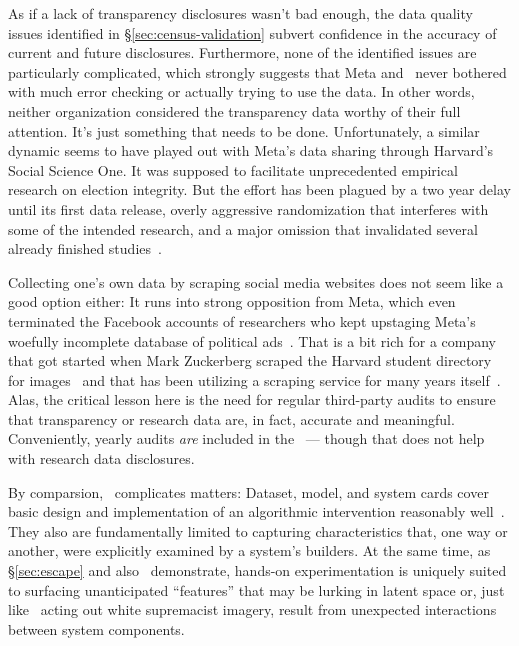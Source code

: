 As if a lack of transparency disclosures wasn't bad enough, the data quality
issues identified in \S\ref{sec:census-validation} subvert confidence in the
accuracy of current and future disclosures. Furthermore, none of the identified
issues are particularly complicated, which strongly suggests that Meta and
\NCMEC\ never bothered with much error checking or actually trying to use the
data. In other words, neither organization considered the transparency data
worthy of their full attention. It's just something that needs to be done.
Unfortunately, a similar dynamic seems to have played out with Meta's data
sharing through Harvard's Social Science One. It was supposed to facilitate
unprecedented empirical research on election integrity. But the effort has been
plagued by a two year delay until its first data release, overly aggressive
randomization that interferes with some of the intended research, and a major
omission that invalidated several already finished
studies~\cite{Hegelich2020,HegelichMarcoea2020,Ingram2022,OHaraNelson2019,Timberg2021}.

Collecting one's own data by scraping social media websites does not seem like a
good option either: It runs into strong opposition from Meta, which even
terminated the Facebook accounts of researchers who kept upstaging Meta's
woefully incomplete database of political
ads~\cite{EdelsonMcCoy2021a,Faife2021a,MerrillTobin2019,Roose2021a}. That is a
bit rich for a company that got started when Mark Zuckerberg scraped the Harvard
student directory for images~\cite{Madrigal2019} and that has been utilizing a
scraping service for many years itself~\cite{Newman2023}. Alas, the critical
lesson here is the need for regular third-party audits to ensure that
transparency or research data are, in fact, accurate and meaningful.
Conveniently, yearly audits \emph{are} included in the \DSA\ --- though that
does not help with research data disclosures.

By comparsion, \AI\ complicates matters: Dataset, model, and system cards cover
basic design and implementation of an algorithmic intervention reasonably
well~\cite{GebruMorgensternea2021,MitchellWuea2019,ProcopeCheemaea2022}. They
also are fundamentally limited to capturing characteristics that, one way or
another, were explicitly examined by a system's builders. At the same time, as
\S\ref{sec:escape} and also~\cite{BirhanePrabhuea2021,CarliniHayesea2023}
demonstrate, hands-on experimentation is uniquely suited to surfacing
unanticipated ``features'' that may be lurking in latent space or, just like
\DALLE\ acting out white supremacist imagery, result from unexpected
interactions between system components.

